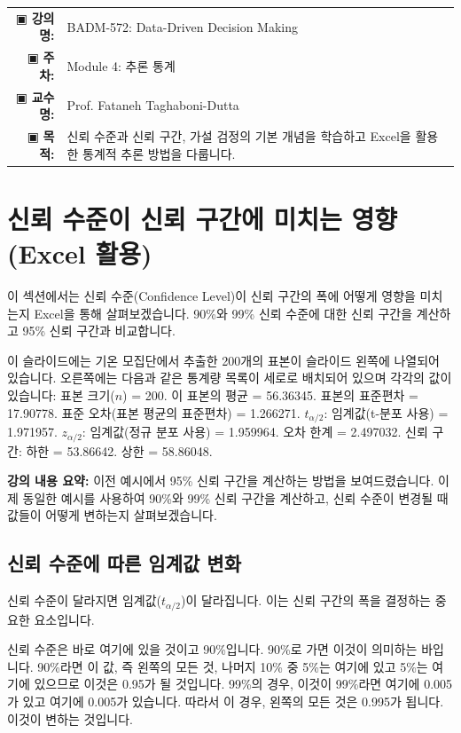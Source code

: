 \documentclass[11pt,a4paper]{article}
\makeatletter
\theoremstyle{definition}
\newcommand{\metainfo}[4]{
\begin{tcolorbox}[
    colback=lightpurple,
    colframe=darkpurple,
    boxrule=1pt,
    arc=2mm,
    left=10pt,
    right=10pt,
    top=8pt,
    bottom=8pt
]
\begin{tabular}{@{}rl@{}}
▣ \textbf{강의명:} & #1 \\[0.3em]
▣ \textbf{주차:} & #2 \\[0.3em]
▣ \textbf{교수명:} & #3 \\[0.3em]
▣ \textbf{목적:} & \begin{minipage}[t]{0.75\textwidth}#4\end{minipage}
\end{tabular}
\end{tcolorbox}
}
\makeatother
\begin{document}
\thispagestyle{firstpage}

\metainfo{BADM-572: Data-Driven Decision Making}{Module 4: 추론 통계}{Prof. Fataneh Taghaboni-Dutta}{신뢰 수준과 신뢰 구간, 가설 검정의 기본 개념을 학습하고 Excel을 활용한 통계적 추론 방법을 다룹니다.}

\tableofcontents
\newpage

\section{신뢰 수준이 신뢰 구간에 미치는 영향 (Excel 활용)}

이 섹션에서는 신뢰 수준(Confidence Level)이 신뢰 구간의 폭에 어떻게 영향을 미치는지 Excel을 통해 살펴보겠습니다. 90\%와 99\% 신뢰 수준에 대한 신뢰 구간을 계산하고 95\% 신뢰 구간과 비교합니다.

\begin{tcolorbox}[title=슬라이드 54: 뉴욕 일일 기온 샘플 Excel 시트 (1/13)]
이 슬라이드에는 기온 모집단에서 추출한 200개의 표본이 슬라이드 왼쪽에 나열되어 있습니다. 오른쪽에는 다음과 같은 통계량 목록이 세로로 배치되어 있으며 각각의 값이 있습니다: 표본 크기($n$) = 200. 이 표본의 평균 = 56.36345. 표본의 표준편차 = 17.90778. 표준 오차(표본 평균의 표준편차) = 1.266271. $t_{\alpha/2}$: 임계값(t-분포 사용) = 1.971957. $z_{\alpha/2}$: 임계값(정규 분포 사용) = 1.959964. 오차 한계 = 2.497032. 신뢰 구간: 하한 = 53.86642. 상한 = 58.86048.
\end{tcolorbox}

\textbf{강의 내용 요약:}
이전 예시에서 95\% 신뢰 구간을 계산하는 방법을 보여드렸습니다. 이제 동일한 예시를 사용하여 90\%와 99\% 신뢰 구간을 계산하고, 신뢰 수준이 변경될 때 값들이 어떻게 변하는지 살펴보겠습니다.

\subsection{신뢰 수준에 따른 임계값 변화}

신뢰 수준이 달라지면 임계값($t_{\alpha/2}$)이 달라집니다. 이는 신뢰 구간의 폭을 결정하는 중요한 요소입니다.

\begin{tcolorbox}[title=슬라이드 56: 뉴욕 일일 기온 샘플 Excel 시트 (3/13)]
신뢰 수준은 바로 여기에 있을 것이고 90\%입니다. 90\%로 가면 이것이 의미하는 바입니다. 90\%라면 이 값, 즉 왼쪽의 모든 것, 나머지 10\% 중 5\%는 여기에 있고 5\%는 여기에 있으므로 이것은 0.95가 될 것입니다. 99\%의 경우, 이것이 99\%라면 여기에 0.005가 있고 여기에 0.005가 있습니다. 따라서 이 경우, 왼쪽의 모든 것은 0.995가 됩니다. 이것이 변하는 것입니다.
\end{tcolorbox}
\end{document}
